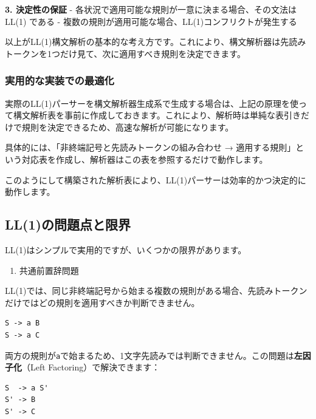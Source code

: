 \textbf{3. 決定性の保証} -
各状況で適用可能な規則が一意に決まる場合、その文法は LL(1) である -
複数の規則が適用可能な場合、LL(1)コンフリクトが発生する

以上がLL(1)構文解析の基本的な考え方です。これにより、構文解析器は先読みトークンを1つだけ見て、次に適用すべき規則を決定できます。

\hypertarget{chapter5-ux5b9fux7528ux7684ux306aux5b9fux88c5ux3067ux306eux6700ux9069ux5316}{%
\subsubsection{実用的な実装での最適化}\label{chapter5-ux5b9fux7528ux7684ux306aux5b9fux88c5ux3067ux306eux6700ux9069ux5316}}

実際のLL(1)パーサーを構文解析器生成系で生成する場合は、上記の原理を使って構文解析表を事前に作成しておきます。これにより、解析時は単純な表引きだけで規則を決定できるため、高速な解析が可能になります。

具体的には、「非終端記号と先読みトークンの組み合わせ →
適用する規則」という対応表を作成し、解析器はこの表を参照するだけで動作します。

このようにして構築された解析表により、LL(1)パーサーは効率的かつ決定的に動作します。

\hypertarget{chapter5-ll1ux306eux554fux984cux70b9ux3068ux9650ux754c}{%
\subsection{LL(1)の問題点と限界}\label{chapter5-ll1ux306eux554fux984cux70b9ux3068ux9650ux754c}}

LL(1)はシンプルで実用的ですが、いくつかの限界があります。

\begin{enumerate}
\def\labelenumi{\arabic{enumi}.}
\tightlist
\item
  共通前置辞問題
\end{enumerate}

LL(1)では、同じ非終端記号から始まる複数の規則がある場合、先読みトークンだけではどの規則を適用すべきか判断できません。

\begin{verbatim}
S -> a B
S -> a C
\end{verbatim}

両方の規則が\texttt{a}で始まるため、1文字先読みでは判断できません。この問題は\textbf{左因子化}（Left
Factoring）で解決できます：

\begin{verbatim}
S  -> a S'
S' -> B
S' -> C
\end{verbatim}

